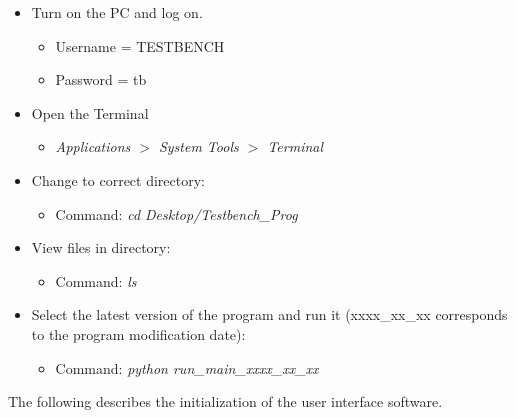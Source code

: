 \documentclass{article}
\begin{document}
\begin{itemize}
\item
Turn on the PC and log on. 
\begin{itemize}
\item
Username = TESTBENCH
\item
Password = tb
\end{itemize}

\item
Open the {Terminal}
\begin{itemize}
\item 
\emph{Applications $>$ System Tools $>$ Terminal}
\end{itemize}

\item
Change to correct directory:
\begin{itemize}
\item
Command: \emph{cd Desktop/Testbench\_Prog}
\end{itemize}

\item
View files in directory:
\begin{itemize}
\item
Command: \emph{ls}
\end{itemize}

\item
Select the latest version of the program and run it (xxxx\_xx\_xx corresponds to the program modification date):
\begin{itemize}
\item
Command: \emph{python run\_main\_xxxx\_xx\_xx}
\end{itemize}

\end{itemize}






The following describes the initialization of the user interface software.
\end{document}
